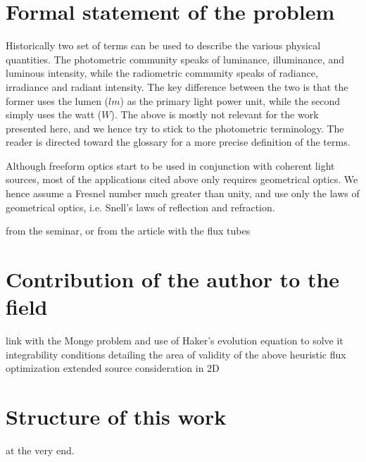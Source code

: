 \section{Formal statement of the problem}

Historically two set of terms can be used to describe the various physical quantities. 
The photometric community speaks of luminance, illuminance, and luminous intensity, while
the radiometric community speaks of radiance, irradiance and radiant intensity. The key 
difference between the two is that the former uses the lumen ($lm$) as the primary
 light power unit, while the second simply uses the watt ($W$).
The above is mostly not relevant for the work presented here, and we hence try to stick 
to the photometric terminology. The reader is directed toward the glossary for a more
precise definition of the terms. 

Although freeform optics start to be used in conjunction with coherent light 
sources, most of the applications cited above only requires geometrical 
optics. We hence assume a Fresnel number much greater than unity, and use only
the laws of geometrical optics, i.e. Snell's laws of reflection and refraction.

\img from the seminar, or from the article with the flux tubes

\section{Contribution of the author to the field}

link with the Monge problem and use of Haker's evolution equation to solve it
integrability conditions detailing the area of validity of the above heuristic
flux optimization
extended source consideration in 2D 

\section{Structure of this work}
\TODO at the very end.


